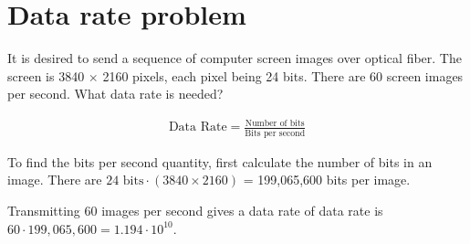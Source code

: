 
\section{Data rate problem}
It is desired to send a sequence of computer screen images over optical fiber. The screen is 3840 $\times$ 2160 pixels, each pixel being 24 bits. There are 60 screen images per second. What data rate is needed?

\begin{align*}
	\text{Data Rate} = \frac{\text{Number of bits}}{\text{Bits per second}}
\end{align*}

To find the bits per second quantity, first calculate the number of bits in an image. There are $24 \text{ bits} \cdot (3840 \times 2160)$ = 199,065,600 bits per image. 

Transmitting 60 images per second gives a data rate of data rate is $60 \cdot 199,065,600 = 1.194 \cdot 10^{10}$.

\section{}
\section{}
\section{}
\section{}
\section{}
\section{}
